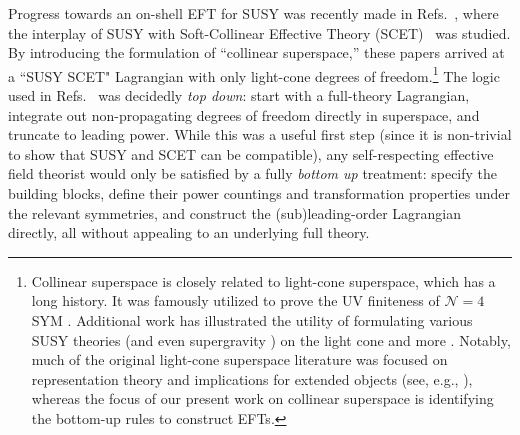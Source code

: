\documentclass[12pt,document,nofootinbib,superscriptaddress,onecolumn,preprintnumbers,balancelastpage]{article}
\DeclareRobustCommand{\Refs}[1]{Refs.~\cite{#1}}
\begin{document}
\begin{spacing}{1.2}
Progress towards an on-shell EFT for SUSY was recently made in \Refs{Cohen:2016jzp, Cohen:2016dcl}, where the interplay of SUSY with Soft-Collinear Effective Theory (SCET)~\cite{Bauer:2000yr, Bauer:2001ct, Bauer:2001yt} was studied.
%
By introducing the formulation of ``collinear superspace,'' these papers arrived at a ``SUSY SCET" Lagrangian with only light-cone degrees of freedom.\footnote{Collinear superspace is closely related to light-cone superspace, which has a long history.
%
It was famously utilized to prove the UV finiteness of $\mathcal{N} = 4$ SYM \cite{Mandelstam:1982cb, Brink:1982pd, Brink:1982wv}.
%
Additional work has illustrated the utility of formulating various SUSY theories \cite{Belitsky:2004yg} (and even supergravity \cite{Kallosh:2009db}) on the light cone and more \cite{Green:1996um,Maldacena:1997re,Belitsky:2004yg,Kallosh:2009db,Hearin:2010dw,Ramond:2009hb}.
%
Notably, much of the original light-cone superspace literature was focused on representation theory and implications for extended objects (see, e.g., \cite{Siegel:1981ec,Brink:1981nb}), whereas the focus of our present work on collinear superspace is identifying the bottom-up rules to construct EFTs.
}
%
The logic used in \Refs{Cohen:2016jzp, Cohen:2016dcl} was decidedly \emph{top down}: start with a full-theory Lagrangian, integrate out non-propagating degrees of freedom directly in superspace, and truncate to leading power.
%
While this was a useful first step (since it is non-trivial to show that SUSY and SCET can be compatible), any self-respecting effective field theorist would only be satisfied by a fully \emph{bottom up} treatment: specify the building blocks, define their power countings and transformation properties under the relevant symmetries, and construct the (sub)leading-order Lagrangian directly, all without appealing to an underlying full theory.



\end{spacing}
\end{document}
